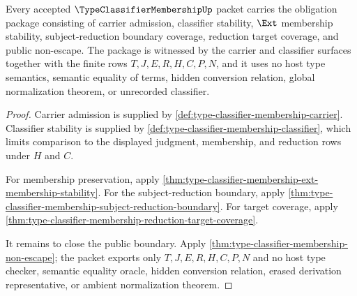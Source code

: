 \begin{theorem}
\label{thm:type-classifier-membership-obligation-closure-package}
Every accepted $\TypeClassifierMembershipUp$ packet carries the obligation package consisting of carrier admission, classifier stability, $\Ext$ membership stability, subject-reduction boundary coverage, reduction target coverage, and public non-escape. The package is witnessed by the carrier and classifier surfaces together with the finite rows $T,J,E,R,H,C,P,N$, and it uses no host type semantics, semantic equality of terms, hidden conversion relation, global normalization theorem, or unrecorded classifier.
\end{theorem}
\begin{proof}
Carrier admission is supplied by \autoref{def:type-classifier-membership-carrier}. Classifier stability is supplied by \autoref{def:type-classifier-membership-classifier}, which limits comparison to the displayed judgment, membership, and reduction rows under $H$ and $C$.

For membership preservation, apply \autoref{thm:type-classifier-membership-ext-membership-stability}. For the subject-reduction boundary, apply \autoref{thm:type-classifier-membership-subject-reduction-boundary}. For target coverage, apply \autoref{thm:type-classifier-membership-reduction-target-coverage}.

It remains to close the public boundary. Apply \autoref{thm:type-classifier-membership-non-escape}; the packet exports only $T,J,E,R,H,C,P,N$ and no host type checker, semantic equality oracle, hidden conversion relation, erased derivation representative, or ambient normalization theorem.
\end{proof}

